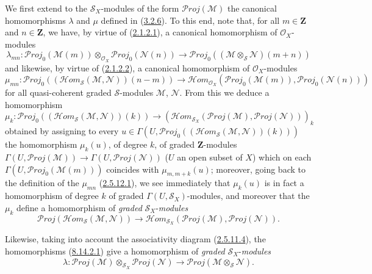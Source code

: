 \begin{env}[8.14.2]
\label{II.8.14.2}
We first extend to the $\mathcal{S}_X$-modules of the form
$\mathcal{P}\mathit{roj}(\mathcal{M})$ the canonical homomorphisms $\lambda$
and $\mu$ defined in (\hyperref[II.3.2.6]{3.2.6}). To this end, note
that, for all $m\in\mathbf{Z}$ and $n\in\mathbf{Z}$, we have, by virtue
of (\hyperref[II.2.1.2.1]{2.1.2.1}), a canonical homomorphism of
$\mathcal{O}_X$-modules
\begin{equation}
\label{II.8.14.2.1}
  \lambda_{mn}:\mathcal{P}\mathit{roj}_0(\mathcal{M}(m))
  \otimes_{\mathcal{O}_X}\mathcal{P}\mathit{roj}_0(\mathcal{N}(n))
  \to\mathcal{P}\mathit{roj}_0
  ((\mathcal{M}\otimes_{\mathcal{S}}\mathcal{N})(m+n))
\tag{8.14.2.1}
\end{equation}
and likewise, by virtue of (\hyperref[II.2.1.2.2]{2.1.2.2}), a
canonical homomorphism of $\mathcal{O}_X$-modules
\begin{equation}
\label{II.8.14.2.2}
  \mu_{mn}:\mathcal{P}\mathit{roj}_0
  ((\mathcal{H}om_{\mathcal{S}}(\mathcal{M},\mathcal{N}))(n-m))
  \to\mathcal{H}om_{\mathcal{O}_X}
  (\mathcal{P}\mathit{roj}_0(\mathcal{M}(m)),
   \mathcal{P}\mathit{roj}_0(\mathcal{N}(n)))
\tag{8.14.2.2}
\end{equation}
for all quasi-coherent graded $\mathcal{S}$-modules
$\mathcal{M}$, $\mathcal{N}$. From this we deduce a homomorphism
\[
  \mu_k:\mathcal{P}\mathit{roj}_0
  ((\mathcal{H}om_{\mathcal{S}}(\mathcal{M},\mathcal{N}))(k))
  \to
  (\mathcal{H}om_{\mathcal{S}_X}
  (\mathcal{P}\mathit{roj}(\mathcal{M}),\mathcal{P}\mathit{roj}(\mathcal{N})))_k
\]
obtained by assigning to every
$u\in\Gamma(U,\mathcal{P}\mathit{roj}_0
((\mathcal{H}om_{\mathcal{S}}(\mathcal{M},\mathcal{N}))(k)))$
the homomorphism $\mu_k(u)$, of degree $k$, of graded $\mathbf{Z}$-modules
$\Gamma(U,\mathcal{P}\mathit{roj}(\mathcal{M}))\to
\Gamma(U,\mathcal{P}\mathit{roj}(\mathcal{N}))$ ($U$ an open subset of $X$) which
on each $\Gamma(U,\mathcal{P}\mathit{roj}_0(\mathcal{M}(m)))$ coincides with
$\mu_{m,m+k}(u)$; moreover, going back to the definition of the $\mu_{mn}$
(\hyperref[II.2.5.12.1]{2.5.12.1}), we see immediately that $\mu_k(u)$ is
in fact a homomorphism of degree $k$ of graded
$\Gamma(U,\mathcal{S}_X)$-modules, and moreover that the $\mu_k$
define a homomorphism of \emph{graded} $\mathcal{S}_X$-\emph{modules}
\begin{equation}
\label{II.8.14.2.3}
  \mathcal{P}\mathit{roj}
  (\mathcal{H}om_{\mathcal{S}}(\mathcal{M},\mathcal{N}))
  \to\mathcal{H}om_{\mathcal{S}_X}
  (\mathcal{P}\mathit{roj}(\mathcal{M}),\mathcal{P}\mathit{roj}(\mathcal{N})).
\tag{8.14.2.3}
\end{equation}

Likewise, taking into account the associativity diagram
(\hyperref[II.2.5.11.4]{2.5.11.4}), the homomorphisms
(\hyperref[II.8.14.2.1]{8.14.2.1}) give a homomorphism of
\emph{graded} $\mathcal{S}_X$-\emph{modules}
\begin{equation}
\label{II.8.14.2.4}
  \lambda:\mathcal{P}\mathit{roj}(\mathcal{M})
  \otimes_{\mathcal{S}_X}\mathcal{P}\mathit{roj}(\mathcal{N})
  \to\mathcal{P}\mathit{roj}(\mathcal{M}\otimes_{\mathcal{S}}\mathcal{N}).
\tag{8.14.2.4}
\end{equation}
\end{env}


